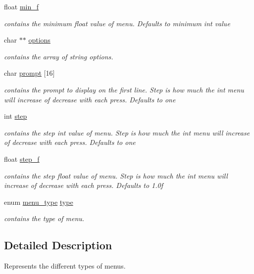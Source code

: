 \begin{DoxyCompactItemize}
float \hyperlink{structmenu__t_a0a6e4f711992fb69e8a57c2af1ab7a05}{min\+\_\+f}
\begin{DoxyCompactList}\small\item\em contains the minimum float value of menu. Defaults to minimum int value \end{DoxyCompactList}\item 
char $\ast$$\ast$ \hyperlink{structmenu__t_ad695cd88051e34817f0f582d4e43c33a}{options}
\begin{DoxyCompactList}\small\item\em contains the array of string options. \end{DoxyCompactList}\item 
char \hyperlink{structmenu__t_a5e3af2830962c2bbcb0a983f2c040c65}{prompt} \mbox{[}16\mbox{]}
\begin{DoxyCompactList}\small\item\em contains the prompt to display on the first line. Step is how much the int menu will increase of decrease with each press. Defaults to one \end{DoxyCompactList}\item 
int \hyperlink{structmenu__t_adc50450bc59ea66a8d67424adc46e24e}{step}
\begin{DoxyCompactList}\small\item\em contains the step int value of menu. Step is how much the int menu will increase of decrease with each press. Defaults to one \end{DoxyCompactList}\item 
float \hyperlink{structmenu__t_a84cfd9226f6554c63ca9f4b11f94d12d}{step\+\_\+f}
\begin{DoxyCompactList}\small\item\em contains the step float value of menu. Step is how much the int menu will increase of decrease with each press. Defaults to 1.\+0f \end{DoxyCompactList}\item 
enum \hyperlink{menu_8h_a6bbf4baf5018b0d76aab6c2e6bf85e62}{menu\+\_\+type} \hyperlink{structmenu__t_a110244ceb7d2a7cba95cfc5758d61c01}{type}
\begin{DoxyCompactList}\small\item\em contains the type of menu. \end{DoxyCompactList}\end{DoxyCompactItemize}


\subsection{Detailed Description}
Represents the different types of menus. 

